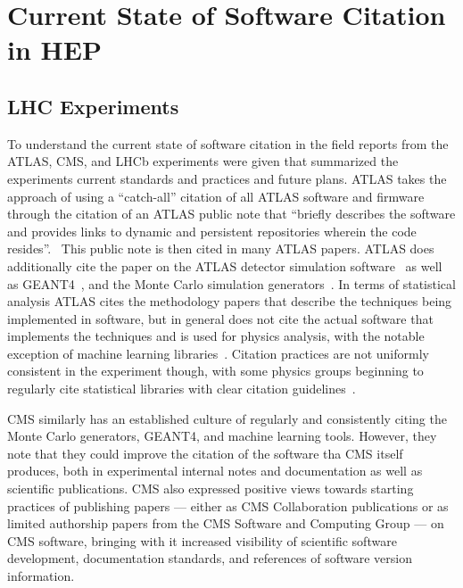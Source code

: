 \section{Current State of Software Citation in HEP}\label{sec:current_state}

\subsection{LHC Experiments}\label{sec:lhc_experiments}

To understand the current state of software citation in the field reports from the ATLAS, CMS, and LHCb experiments were given that summarized the experiments current standards and practices and future plans.
ATLAS takes the approach of using a ``catch-all'' citation of all ATLAS software and firmware through the citation of an ATLAS public note that ``briefly describes the software and provides links to dynamic and persistent repositories wherein the code resides''.~\cite{ATL-SOFT-PUB-2021-001}
This public note is then cited in many ATLAS papers.
ATLAS does additionally cite the paper on the ATLAS detector simulation software~\cite{SOFT-2010-01} as well as GEANT4~\cite{GEANT4:2002zbu}, and the Monte Carlo simulation generators~\cite{Sjostrand:2007gs,Sjostrand:2014zea,Alwall:2014hca,Sherpa:2019gpd}.
In terms of statistical analysis ATLAS cites the methodology papers that describe the techniques being implemented in software, but in general does not cite the actual software that implements the techniques and is used for physics analysis, with the notable exception of machine learning libraries~\cite{chollet2015keras,tensorflow2015-whitepaper}.
Citation practices are not uniformly consistent in the experiment though, with some physics groups beginning to regularly cite statistical libraries with clear citation guidelines~\cite{pyhf,pyhf_joss}.

CMS similarly has an established culture of regularly and consistently citing the Monte Carlo generators, GEANT4, and machine learning tools.
However, they note that they could improve the citation of the software tha CMS itself produces, both in experimental internal notes and documentation as well as scientific publications.
CMS also expressed positive views towards starting practices of publishing papers --- either as CMS Collaboration publications or as limited authorship papers from the CMS Software and Computing Group --- on CMS software, bringing with it increased visibility of scientific software development, documentation standards, and references of software version information.

